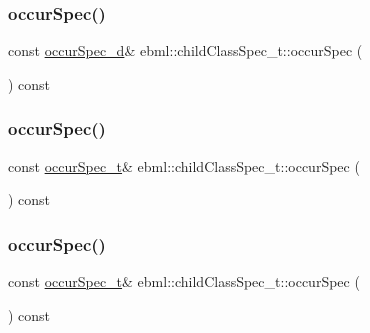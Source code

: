 \mbox{\label{classebml_1_1childClassSpec__t_a04950228350dfc2fc9949c67e66d1bdc}} 
\subsubsection{\texorpdfstring{occur\+Spec()}{occurSpec()}\hspace{0.1cm}{\footnotesize\ttfamily [1/3]}}
{\footnotesize\ttfamily const \mbox{\hyperlink{namespaceebml_a1cd7dafb7e8e8975fecc4a11ef03c5be}{occur\+Spec\+\_\+d}}\& ebml\+::child\+Class\+Spec\+\_\+t\+::occur\+Spec (\begin{DoxyParamCaption}{ }\end{DoxyParamCaption}) const}

\mbox{\label{classebml_1_1childClassSpec__t_ac25a61d6ae835821a2b59a8edfa5e8ff}} 
\subsubsection{\texorpdfstring{occur\+Spec()}{occurSpec()}\hspace{0.1cm}{\footnotesize\ttfamily [2/3]}}
{\footnotesize\ttfamily const \mbox{\hyperlink{structebml_1_1occurSpec__t}{occur\+Spec\+\_\+t}}\& ebml\+::child\+Class\+Spec\+\_\+t\+::occur\+Spec (\begin{DoxyParamCaption}\item[{\mbox{\hyperlink{namespaceebml_a86c5f604ddf12a74aa9812e997a58691}{ebml\+I\+D\+\_\+t}}}]{ }\end{DoxyParamCaption}) const}

\mbox{\label{classebml_1_1childClassSpec__t_a7a7b1530216bb3a3a7d49251f94dc729}} 
\subsubsection{\texorpdfstring{occur\+Spec()}{occurSpec()}\hspace{0.1cm}{\footnotesize\ttfamily [3/3]}}
{\footnotesize\ttfamily const \mbox{\hyperlink{structebml_1_1occurSpec__t}{occur\+Spec\+\_\+t}}\& ebml\+::child\+Class\+Spec\+\_\+t\+::occur\+Spec (\begin{DoxyParamCaption}\item[{const \mbox{\hyperlink{classebml_1_1ebmlElementClass}{ebml\+Element\+Class}} $\ast$}]{ }\end{DoxyParamCaption}) const}

